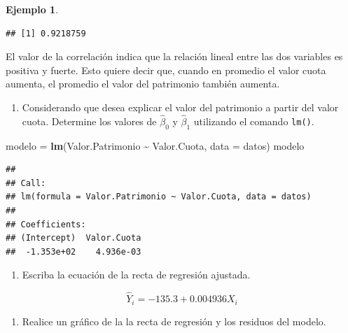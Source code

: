 \documentclass[
  11pt,
]{book}
\newenvironment{Shaded}{\begin{snugshade}}{\end{snugshade}}
\newcommand{\AttributeTok}[1]{\textcolor[rgb]{0.13,0.29,0.53}{#1}}
\newcommand{\FunctionTok}[1]{\textcolor[rgb]{0.13,0.29,0.53}{\textbf{#1}}}
\newcommand{\NormalTok}[1]{#1}
\newcommand{\OtherTok}[1]{\textcolor[rgb]{0.56,0.35,0.01}{#1}}
\newcommand{\SpecialCharTok}[1]{\textcolor[rgb]{0.81,0.36,0.00}{\textbf{#1}}}
\providecommand{\tightlist}{%
  \setlength{\itemsep}{0pt}\setlength{\parskip}{0pt}}
\theoremstyle{definition}
\theoremstyle{definition}
\newtheorem{example}{Ejemplo}[chapter]
\theoremstyle{definition}
\theoremstyle{definition}
\theoremstyle{remark}
\begin{document}
\begin{example}
\begin{verbatim}
## [1] 0.9218759
\end{verbatim}

El valor de la correlación indica que la relación lineal entre las dos variables es positiva y fuerte. Esto quiere decir que, cuando en promedio el valor cuota aumenta, el promedio el valor del patrimonio también aumenta.

\begin{enumerate}
\def\labelenumi{\arabic{enumi}.}
\setcounter{enumi}{2}
\tightlist
\item
  Considerando que desea explicar el valor del patrimonio a partir del valor cuota. Determine los valores de \(\widehat{\beta}_0\) y \(\widehat{\beta}_1\) utilizando el comando \texttt{lm()}.
\end{enumerate}

\begin{Shaded}
\begin{Highlighting}[]
\NormalTok{modelo }\OtherTok{=} \FunctionTok{lm}\NormalTok{(Valor.Patrimonio }\SpecialCharTok{\textasciitilde{}}\NormalTok{ Valor.Cuota, }\AttributeTok{data =}\NormalTok{ datos)}
\NormalTok{modelo}
\end{Highlighting}
\end{Shaded}

\begin{verbatim}
## 
## Call:
## lm(formula = Valor.Patrimonio ~ Valor.Cuota, data = datos)
## 
## Coefficients:
## (Intercept)  Valor.Cuota  
##  -1.353e+02    4.936e-03
\end{verbatim}

\begin{enumerate}
\def\labelenumi{\arabic{enumi}.}
\setcounter{enumi}{3}
\tightlist
\item
  Escriba la ecuación de la recta de regresión ajustada.
\end{enumerate}

\[
\widehat{Y}_i = -135.3 + 0.004936X_i
\]

\begin{enumerate}
\def\labelenumi{\arabic{enumi}.}
\setcounter{enumi}{4}
\tightlist
\item
  Realice un gráfico de la la recta de regresión y los residuos del modelo.
\end{enumerate}


\end{example}
\end{document}
